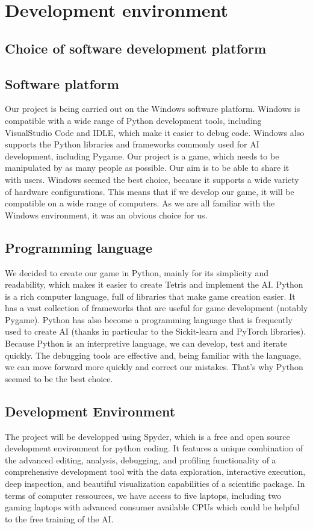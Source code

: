 \documentclass[conference]{IEEEtran}
\begin{document}
\section{Development environment}
\subsection{Choice of software development platform}

\subsection*{Software platform}

Our project is being carried out on the Windows software platform. Windows is compatible with a wide range of Python development tools, including VisualStudio Code and IDLE, which make it easier to debug code. Windows also supports the Python libraries and frameworks commonly used for AI development, including Pygame\cite{b4}. Our project is a game, which needs to be manipulated by as many people as possible. Our aim is to be able to share it with users. Windows seemed the best choice, because it supports a wide variety of hardware configurations. This means that if we develop our game, it will be compatible on a wide range of computers. As we are all familiar with the Windows environment, it was an obvious choice for us.




\subsection*{Programming language}

We decided to create our game in Python, mainly for its simplicity and readability, which makes it easier to create Tetris and implement the AI. Python is a rich computer language, full of libraries that make game creation easier. It has a vast collection of frameworks that are useful for game development (notably Pygame\cite{b4}). Python has also become a programming language that is frequently used to create AI (thanks in particular to the Sickit-learn and PyTorch libraries). Because Python is an interpretive language, we can develop, test and iterate quickly. The debugging tools are effective and, being familiar with the language, we can move forward more quickly and correct our mistakes. 
That's why Python seemed to be the best choice. 

\subsection*{Development Environment}
The project will be developped using Spyder, which is a free and open source development environment for python coding.  It features a unique combination of the advanced editing, analysis, debugging, and profiling functionality of a comprehensive development tool with the data exploration, interactive execution, deep inspection, and beautiful visualization capabilities of a scientific package. In terms of computer ressources, we have  access to five laptops, including two gaming laptops with advanced consumer available CPUs which could be helpful to the free training of the AI.
\end{document}
